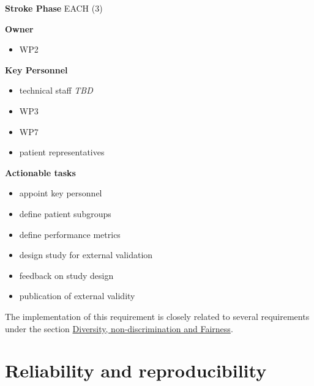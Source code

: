 \documentclass[
  letterpaper,
  DIV=11,
  numbers=noendperiod]{scrreport}
\providecommand{\tightlist}{%
  \setlength{\itemsep}{0pt}\setlength{\parskip}{0pt}}\usepackage{longtable,booktabs,array}
\begin{document}
\textbf{Stroke Phase} EACH (3)

\textbf{Owner}

\begin{itemize}
\tightlist
\item
  WP2
\end{itemize}

\textbf{Key Personnel}

\begin{itemize}
\tightlist
\item
  technical staff \emph{TBD}
\item
  WP3
\item
  WP7
\item
  patient representatives
\end{itemize}

\textbf{Actionable tasks}

\begin{itemize}
\tightlist
\item
  appoint key personnel
\item
  define patient subgroups
\item
  define performance metrics
\item
  design study for external validation
\item
  feedback on study design
\item
  publication of external validity
\end{itemize}

\begin{tcolorbox}[enhanced jigsaw, arc=.35mm, breakable, coltitle=black, toptitle=1mm, colbacktitle=quarto-callout-note-color!10!white, toprule=.15mm, left=2mm, bottomrule=.15mm, opacitybacktitle=0.6, titlerule=0mm, colback=white, opacityback=0, title=\textcolor{quarto-callout-note-color}{\faInfo}\hspace{0.5em}{Note}, bottomtitle=1mm, colframe=quarto-callout-note-color-frame, leftrule=.75mm, rightrule=.15mm]

The implementation of this requirement is closely related to several
requirements under the section
\protect\hyperlink{diversity-non-discrimination-and-fairness}{Diversity,
non-discrimination and Fairness}.

\end{tcolorbox}

\hypertarget{reliability-and-reproducibility}{%
\section{Reliability and
reproducibility}\label{reliability-and-reproducibility}}
\end{document}
